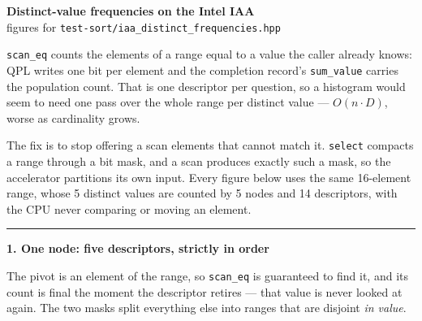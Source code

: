 \documentclass[11pt]{article}
\newcommand{\op}[1]{\texttt{#1}}
\begin{document}
\begin{center}
  {\Large\bfseries Distinct-value frequencies on the Intel IAA}\\[2pt]
  {\small figures for \op{test-sort/iaa\_distinct\_frequencies.hpp}}
\end{center}

\op{scan\_eq} counts the elements of a range equal to a value the caller already
knows: QPL writes one bit per element and the completion record's
\op{sum\_value} carries the population count. That is one descriptor per
question, so a histogram would seem to need one pass over the whole range per
distinct value --- $O(n\!\cdot\!D)$, worse as cardinality grows.

The fix is to stop offering a scan elements that cannot match it. \op{select}
compacts a range through a bit mask, and a scan produces exactly such a mask, so
the accelerator partitions its own input. Every figure below uses the same
16-element range, whose 5 distinct values are counted by 5 nodes and 14
descriptors, with the CPU never comparing or moving an element.

\bigskip
\hrule
\bigskip

{\large\bfseries 1. One node: five descriptors, strictly in order}

The pivot is an element of the range, so \op{scan\_eq} is guaranteed to find it,
and its count is final the moment the descriptor retires --- that value is never
looked at again. The two masks split everything else into ranges that are
disjoint \emph{in value}.
\end{document}
